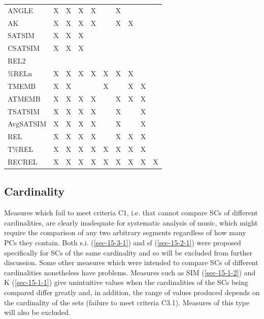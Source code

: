 \documentclass{article}
\begin{document}
\begin{table}[htb]
\begin{center}
\begin{tabular}{llllllllll}
 ANGLE       &  X   &  X   &  X     &  X     &        &  X     &      &      &      \\
 AK          &  X   &  X   &  X     &  X     &        &  X     &  X   &      &      \\
 SATSIM      &  X   &  X   &  X     &        &        &        &      &      &      \\
 CSATSIM     &  X   &  X   &  X     &        &        &        &      &      &      \\
 REL2        &      &      &        &        &        &        &      &      &      \\
 \%RELn      &  X   &  X   &  X     &  X     &  X     &  X     &  X   &      &      \\
 TMEMB       &  X   &  X   &        &        &  X     &        &  X   &  X   &      \\
 ATMEMB      &  X   &  X   &  X     &  X     &        &  X     &  X   &  X   &      \\
 TSATSIM     &  X   &  X   &  X     &  X     &        &  X     &      &  X   &      \\
 AvgSATSIM   &  X   &  X   &  X     &  X     &        &  X     &      &  X   &      \\
 REL         &  X   &  X   &  X     &  X     &        &  X     &  X   &  X   &      \\
 T\%REL      &  X   &  X   &  X     &  X     &  X     &  X     &  X   &  X   &      \\
 RECREL      &  X   &  X   &  X     &  X     &  X     &  X     &  X   &  X   &  X   \\
\hline
\end{tabular}
\end{center}
\end{table}
\subsection{Cardinality}
\label{sec-6-2}

Measures which fail to meet criteria C1, i.e. that cannot compare SCs
of different cardinalities, are clearly inadequate for systematic
analysis of music, which might require the comparison of any two
arbitrary segments regardless of how many PCs they contain. Both
s.i. (\ref{sec-15-3-1}) and sf (\ref{sec-15-2-1}) were proposed specifically for SCs of the same
cardinality and so will be excluded from further discussion. Some
other measures which were intended to compare SCs of different
cardinalities nonetheless have problems. Measures such as SIM (\ref{sec-15-1-2})
and K (\ref{sec-15-1-1}) give unintuitive values when the cardinalities of the SCs
being compared differ greatly and, in addition, the range of values
produced depends on the cardinality of the sets (failure to meet
criteria C3.1). Measures of this type will also be excluded.
\end{document}
